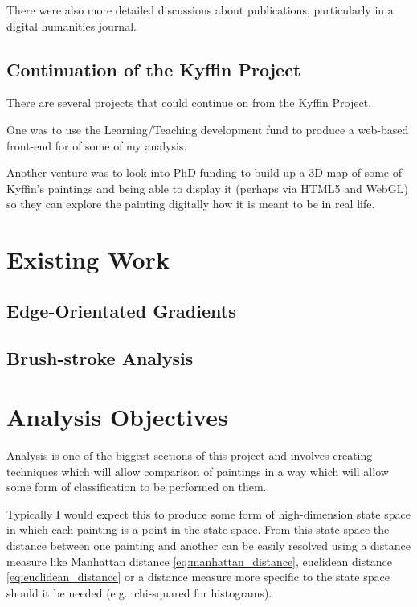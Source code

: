 There were also more detailed discussions about publications, particularly in a digital humanities
journal.


\subsection{Continuation of the Kyffin Project}

There are several projects that could continue on from the Kyffin Project.

One was to use the Learning/Teaching development fund to produce a web-based front-end for of some
of my analysis.

Another venture was to look into PhD funding to build up a 3D map of some of Kyffin's paintings
and being able to display it (perhaps via HTML5 and WebGL) so they can explore the painting 
digitally how it is meant to be in real life.



\section{Existing Work}

\subsection{Edge-Orientated Gradients}\label{sec:existing-hogs}

\subsection{Brush-stroke Analysis}\label{sec:existing-brushstroke}


\section{Analysis Objectives}
Analysis is one of the biggest sections of this project and involves creating techniques which 
will allow comparison of paintings in a way which will allow some form of classification to be
performed on them.

Typically I would expect this to produce some form of high-dimension state space in which each
painting is a point in the state space. From this state space the distance between one painting
and another can be easily resolved using a distance measure like Manhattan distance 
\eqref{eq:manhattan_distance}, euclidean distance \eqref{eq:euclidean_distance} or a distance 
measure more specific to the state space should it be needed (e.g.: chi-squared for histograms).

